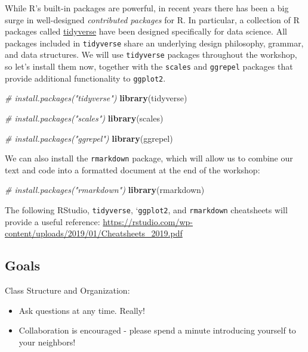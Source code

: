 \documentclass[]{book}
\newenvironment{Shaded}{\begin{snugshade}}{\end{snugshade}}
\newcommand{\KeywordTok}[1]{\textcolor[rgb]{0.13,0.29,0.53}{\textbf{#1}}}
\newcommand{\CommentTok}[1]{\textcolor[rgb]{0.56,0.35,0.01}{\textit{#1}}}
\newcommand{\NormalTok}[1]{#1}
\providecommand{\tightlist}{%
  \setlength{\itemsep}{0pt}\setlength{\parskip}{0pt}}
\begin{document}
While R's built-in packages are powerful, in recent years there has been
a big surge in well-designed \emph{contributed packages} for R. In
particular, a collection of R packages called
\href{https://www.tidyverse.org/}{tidyverse} have been designed
specifically for data science. All packages included in
\texttt{tidyverse} share an underlying design philosophy, grammar, and
data structures. We will use \texttt{tidyverse} packages throughout the
workshop, so let's install them now, together with the \texttt{scales}
and \texttt{ggrepel} packages that provide additional functionality to
\texttt{ggplot2}.

\begin{Shaded}
\begin{Highlighting}[]
\CommentTok{# install.packages("tidyverse")}
\KeywordTok{library}\NormalTok{(tidyverse)}

\CommentTok{# install.packages("scales")}
\KeywordTok{library}\NormalTok{(scales)}

\CommentTok{# install.packages("ggrepel") }
\KeywordTok{library}\NormalTok{(ggrepel)}
\end{Highlighting}
\end{Shaded}

We can also install the \texttt{rmarkdown} package, which will allow us
to combine our text and code into a formatted document at the end of the
workshop:

\begin{Shaded}
\begin{Highlighting}[]
\CommentTok{# install.packages("rmarkdown")}
\KeywordTok{library}\NormalTok{(rmarkdown)}
\end{Highlighting}
\end{Shaded}

The following RStudio, \texttt{tidyverse}, `\texttt{ggplot2}, and
\texttt{rmarkdown} cheatsheets will provide a useful reference:
\url{https://rstudio.com/wp-content/uploads/2019/01/Cheatsheets_2019.pdf}

\subsection{Goals}\label{goals-1}

Class Structure and Organization:

\begin{itemize}
\tightlist
\item
  Ask questions at any time. Really!
\item
  Collaboration is encouraged - please spend a minute introducing
  yourself to your neighbors!
\end{itemize}
\end{document}
